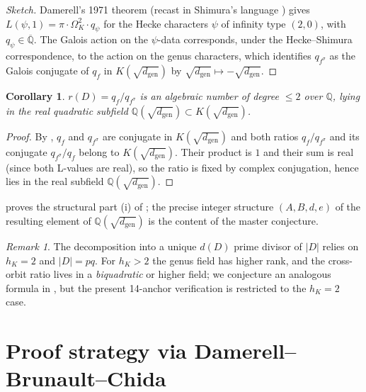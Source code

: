 \documentclass[11pt]{amsart}
\newtheorem{corollary}[theorem]{Corollary}
\theoremstyle{definition}
\theoremstyle{remark}
\newtheorem{remark}[theorem]{Remark}
\newcommand{\Q}{\mathbb{Q}}
\begin{document}
\begin{proof}[Sketch]
Damerell's 1971 theorem \cite{Damerell1971} (recast in Shimura's
language \cite{Shimura1976}) gives
\(L(\psi, 1) = \pi \cdot \Omega_{K}^{2} \cdot q_{\psi}\) for the
Hecke characters \(\psi\) of infinity type \((2, 0)\), with
\(q_{\psi} \in \overline{\Q}\). The Galois action on the
\(\psi\)-data corresponds, under the Hecke--Shimura
correspondence, to the action on the genus characters, which
identifies \(q_{f^{\sigma}}\) as the Galois conjugate of \(q_{f}\)
in \(K(\sqrt{d_{\mathrm{gen}}})\) by
\(\sqrt{d_{\mathrm{gen}}} \mapsto -\sqrt{d_{\mathrm{gen}}}\).
\end{proof}

\begin{corollary}\label{cor:degree-le-2}
\(r(D) = q_{f}/q_{f^{\sigma}}\) is an algebraic number of degree
\(\le 2\) over \(\Q\), lying in the real quadratic subfield
\(\Q(\sqrt{d_{\mathrm{gen}}}) \subset K(\sqrt{d_{\mathrm{gen}}})\).
\end{corollary}

\begin{proof}
By , \(q_{f}\) and \(q_{f^{\sigma}}\) are
conjugate in \(K(\sqrt{d_{\mathrm{gen}}})\) and both ratios
\(q_{f}/q_{f^{\sigma}}\) and its conjugate
\(q_{f^{\sigma}}/q_{f}\) belong to
\(K(\sqrt{d_{\mathrm{gen}}})\). Their product is \(1\) and their
sum is real (since both L-values are real), so the ratio is fixed
by complex conjugation, hence lies in the real subfield
\(\Q(\sqrt{d_{\mathrm{gen}}})\).
\end{proof}

 proves the structural part (i) of
; the precise integer structure \((A, B, d, e)\) of
the resulting element of \(\Q(\sqrt{d_{\mathrm{gen}}})\) is the
content of the master conjecture.

\begin{remark}\label{rem:why-pq}
The decomposition into a unique \(d(D)\) prime divisor of \(|D|\)
relies on \(h_{K} = 2\) and \(|D| = pq\). For \(h_{K} > 2\) the
genus field has higher rank, and the cross-orbit ratio lives in a
\emph{biquadratic} or higher field; we conjecture an analogous
formula in , but the present 14-anchor
verification is restricted to the \(h_{K} = 2\) case.
\end{remark}


\section{Proof strategy via Damerell--Brunault--Chida}\label{sec:proof-sketch}
\end{document}
